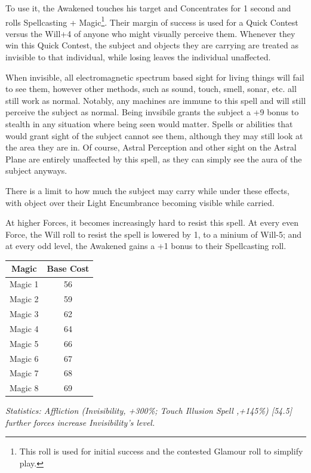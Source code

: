 \begin{multicols}{3}
	To use it, the Awakened touches his target and Concentrates for 1 second and rolls Spellcasting + Magic\footnote{This roll is used for initial success and the contested Glamour roll to simplify play.}. Their margin of success is used for a Quick Contest versus the Will+4 of anyone who might visually perceive them. Whenever they win this Quick Contest, the subject and objects they are carrying are treated as invisible to that individual, while losing leaves the individual unaffected.
	
	When invisible, all electromagnetic spectrum based sight for living things will fail to see them, however other methods, such as sound, touch, smell, sonar, etc. all still work as normal. Notably, any machines are immune to this spell and will still perceive the subject as normal. Being invsibile grants the subject a +9 bonus to stealth in any situation where being seen would matter. Spells or abilities that would grant sight of the subject cannot see them, although they may still look at the area they are in. Of course, Astral Perception and other sight on the Astral Plane are entirely unaffected by this spell, as they can simply see the aura of the subject anyways.
	
	There is a limit to how much the subject may carry while under these effects, with object over their Light Encumbrance becoming visible while carried.
	
	At higher Forces, it becomes increasingly hard to resist this spell. At every even Force, the Will roll to resist the spell is lowered by 1, to a minium of Will-5; and at every odd level, the Awakened gains a +1 bonus to their Spellcasting roll.
		
	\begin{center}
		\begin{tabular}{|c|c|}
			\hline
			Magic & Base Cost \\
			\hline
			\hline
			Magic 1 & 56 \\
			Magic 2 & 59 \\
			Magic 3 & 62 \\
			Magic 4 & 64 \\
			Magic 5 & 66 \\
			Magic 6 & 67 \\
			Magic 7 & 68 \\
			Magic 8 & 69 \\
			\hline
		\end{tabular}
	\end{center}
	
	\textcolor{OliveGreen}{\textit{Statistics: Affliction (Invisibility, +300\%; Touch Illusion Spell ,+145\%) [54.5]  further forces increase Invisibility's level. }}
	

\end{multicols}
